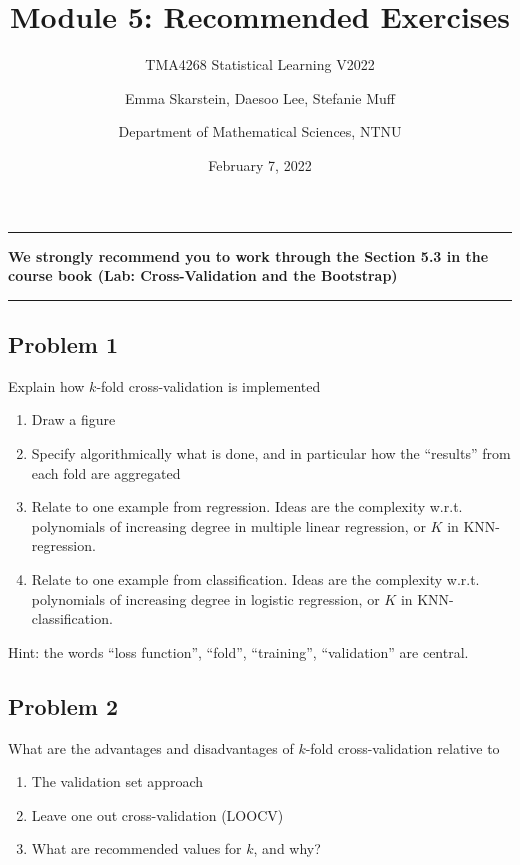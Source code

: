 \documentclass[]{article}
\title{Module 5: Recommended Exercises}
\subtitle{TMA4268 Statistical Learning V2022}
\author{Emma Skarstein, Daesoo Lee, Stefanie Muff \and Department of Mathematical Sciences, NTNU}
\date{February 7, 2022}
\providecommand{\tightlist}{%
  \setlength{\itemsep}{0pt}\setlength{\parskip}{0pt}}
\begin{document}
\maketitle

\begin{center}\rule{0.5\linewidth}{0.5pt}\end{center}

\textbf{We strongly recommend you to work through the Section 5.3 in the
course book (Lab: Cross-Validation and the Bootstrap)}

\begin{center}\rule{0.5\linewidth}{0.5pt}\end{center}

\hypertarget{problem-1}{%
\subsection{Problem 1}\label{problem-1}}

Explain how \(k\)-fold cross-validation is implemented

\begin{enumerate}
\def\labelenumi{\alph{enumi})}
\item
  Draw a figure
\item
  Specify algorithmically what is done, and in particular how the
  ``results'' from each fold are aggregated
\item
  Relate to one example from regression. Ideas are the complexity w.r.t.
  polynomials of increasing degree in multiple linear regression, or
  \(K\) in KNN-regression.
\item
  Relate to one example from classification. Ideas are the complexity
  w.r.t. polynomials of increasing degree in logistic regression, or
  \(K\) in KNN-classification.
\end{enumerate}

Hint: the words ``loss function'', ``fold'', ``training'',
``validation'' are central.

\hypertarget{problem-2}{%
\subsection{Problem 2}\label{problem-2}}

What are the advantages and disadvantages of \(k\)-fold cross-validation
relative to

\begin{enumerate}
\def\labelenumi{\alph{enumi})}
\tightlist
\item
  The validation set approach
\item
  Leave one out cross-validation (LOOCV)
\item
  What are recommended values for \(k\), and why?
\end{enumerate}
\end{document}
